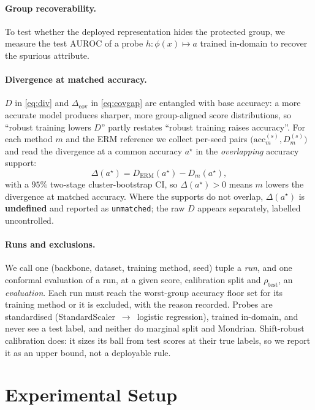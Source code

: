 \documentclass[pdflatex,sn-basic]{sn-jnl}%
\theoremstyle{thmstyleone}%
\newcommand{\cov}{\mathrm{cov}}
\newcommand{\covgap}{\Delta_{\cov}}
\newcommand{\auroc}{\mathrm{AUROC}}
\newcommand{\rhotest}{\rho_{\mathrm{test}}}
\begin{document}
\paragraph{Group recoverability.} To test whether the deployed representation
hides the protected group, we measure the test $\auroc$ of a probe
$h:\phi(x)\mapsto a$ trained in-domain to recover the spurious attribute.

\paragraph{Divergence at matched accuracy.} $D$ in \eqref{eq:div} and $\covgap$ in
\eqref{eq:covgap} are entangled with base accuracy: a more accurate model produces
sharper, more group-aligned score distributions, so ``robust training lowers $D$''
partly restates ``robust training raises accuracy''. For each method $m$ and the ERM
reference we collect per-seed pairs $\big(\mathrm{acc}^{(s)}_m,D^{(s)}_m\big)$ and read
the divergence at a common accuracy $a^\star$ in the \emph{overlapping} accuracy
support:
\begin{equation}
\Delta(a^\star)=D_{\mathrm{ERM}}(a^\star)-D_m(a^\star),
\label{eq:matched}
\end{equation}
with a $95\%$ two-stage cluster-bootstrap CI, so $\Delta(a^\star)>0$ means $m$ lowers the
divergence at matched accuracy. Where the supports do not overlap,
$\Delta(a^\star)$ is \textbf{undefined} and reported as \texttt{unmatched}; the raw $D$
appears separately, labelled uncontrolled.

\paragraph{Runs and exclusions.} We call one (backbone, dataset, training method, seed) tuple a
\emph{run}, and one conformal evaluation of a run, at a given score, calibration split and
$\rhotest$, an \emph{evaluation}. Each run must reach the worst-group accuracy floor set for its
training method or it is excluded, with the reason recorded. Probes are standardised
(StandardScaler~$\to$~logistic regression), trained in-domain, and never see a test label, and
neither do marginal split and Mondrian. Shift-robust calibration does: it sizes its ball from test
scores at their true labels, so we report it as an upper bound, not a deployable rule.

\section{Experimental Setup}
\label{sec:exp}
\end{document}
